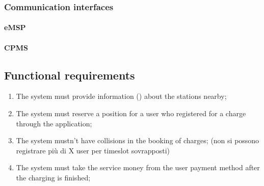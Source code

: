 
\subsubsection{Communication interfaces}
\paragraph{\ac{eMSP}}
\paragraph{\ac{CPMS}}

\subsection{Functional requirements}

\begin{enumerate}[label=\textbf{R\arabic*}]
    \item The system must provide information () about the stations nearby;
    \item The system must reserve a position for a user who registered for a charge through the application;
    \item The system mustn't have collisions in the booking of charges; (non si possono registrare più di X user per timeslot sovrapposti)
    \item The system must take the service money from the user payment method after the charging is finished;
\end{enumerate}
\clearpage
